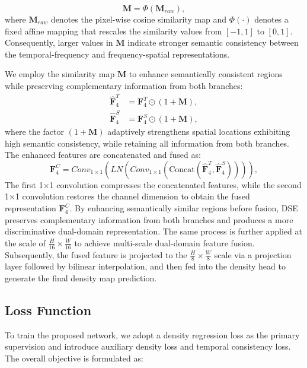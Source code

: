 \documentclass[lettersize,journal]{IEEEtran}
\begin{document}
\begin{equation}
\mathbf{M}
=
\Phi
\left(
\mathbf{M}_{raw}
\right),
\end{equation}
where $\mathbf{M}_{raw}$ denotes the pixel-wise cosine similarity map and $\Phi(\cdot)$ denotes a fixed affine mapping that rescales the similarity values from $[-1,1]$ to $[0,1]$. Consequently, larger values in $\mathbf{M}$ indicate stronger semantic consistency between the temporal-frequency and frequency-spatial representations.

We employ the similarity map $\mathbf{M}$ to enhance semantically consistent regions while preserving complementary information from both branches:
\begin{equation}
\begin{aligned}
\hat{\mathbf{F}}_4^{T}
&=
\mathbf{F}_4^{T}
\odot
(1+\mathbf{M}),\\
\hat{\mathbf{F}}_4^{S}
&=
\mathbf{F}_4^{S}
\odot
(1+\mathbf{M}),
\end{aligned}
\end{equation}
where the factor $(1+\mathbf{M})$ adaptively strengthens spatial locations exhibiting high semantic consistency, while retaining all information from both branches. The enhanced features are concatenated and fused as:
\begin{equation}
\mathbf{F}_4^{C}
=
Conv_{1\times1}
\left(
LN
\left(
Conv_{1\times1}
\left(
\mathrm{Concat}
\left(
\hat{\mathbf{F}}_4^{T},
\hat{\mathbf{F}}_4^{S}
\right)
\right)
\right)
\right),
\end{equation}
The first 1×1 convolution compresses the concatenated features, while the second 1×1 convolution restores the channel dimension to obtain the fused representation $\mathbf{F}_4^{C}$. By enhancing semantically similar regions before fusion, DSE preserves complementary information from both branches and produces a more discriminative dual-domain representation. The same process is further applied at the scale of $\frac{H}{16}\times\frac{W}{16}$ to achieve multi-scale dual-domain feature fusion. Subsequently, the fused feature is projected to the $\frac{H}{8}\times\frac{W}{8}$ scale via a projection layer followed by bilinear interpolation, and then fed into the density head to generate the final density map prediction.



\subsection{Loss Function}\label{ls}
To train the proposed network, we adopt a density regression loss as the primary supervision and introduce auxiliary density loss and temporal consistency loss. The overall objective is formulated as:
\end{document}
